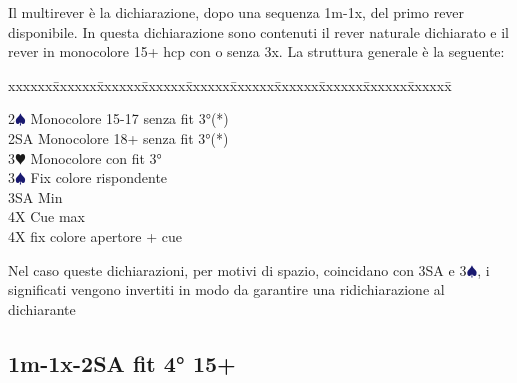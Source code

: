 \documentclass[a4paper,italian]{article}
\newcommand{\BH}{\textcolor{Red2}{$\varheartsuit${}}}
\newcommand{\BS}{\textcolor{MidnightBlue}{$\spadesuit${}}}
\newenvironment{bidtable}
{\begin{tabbing}

    xxxxxx\=xxxxxx\=xxxxxx\=xxxxxx\=xxxxxx\=xxxxxx\=xxxxxx\=xxxxxx\=xxxxxx\=xxxxxx\=\kill}
{\end{tabbing} }%
\newenvironment{attenzione}[1]
{\begin{tcolorbox}[colframe=red!80!white,title=#1]}
    {
\end{tcolorbox} }%
\begin{document}
                                Il multirever è la dichiarazione, dopo una sequenza 1m-1x, del primo rever disponibile. In questa dichiarazione sono contenuti il rever naturale dichiarato e il rever in monocolore 15+ hcp con o senza 3x. La struttura generale è la seguente:
                                \bigbreak
                                \begin{bidtable}

                                    2\BS \> Monocolore 15-17 senza fit 3°(*)\\
                                    2SA \> Monocolore 18+ senza fit 3°(*)\\
                                    3\BH \> Monocolore con fit 3°\+\\
                                    3\BS \> Fix colore rispondente\+\\
                                    3SA \> Min\\
                                    4X \> Cue max\-\\
                                    4X \> fix colore apertore + cue\-
                                \end{bidtable}
                                \bigbreak
                                \begin{attenzione}{ATTENZIONE(*)}
                                    Nel caso queste dichiarazioni, per motivi di spazio, coincidano con 3SA e 3\BS , i significati vengono invertiti in modo da garantire una ridichiarazione al dichiarante
                                \end{attenzione}
                                \newpage
                                \subsection{1m-1x-2SA fit 4° 15+}\label{2SAfit}
\end{document}
